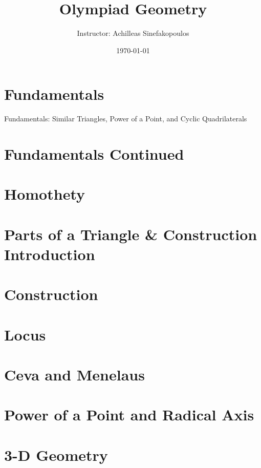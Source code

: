 \documentclass[11pt, twoside]{scrbook}
\begin{document}
\title{Olympiad Geometry}


\author{Instructor: Achilleas Sinefakopoulos}
\date{\today}

\maketitle

\setcounter{secnumdepth}{3}
\setcounter{tocdepth}{3}

\tableofcontents

\chapter{Fundamentals}
Fundamentals: Similar Triangles, Power of a Point, and Cyclic Quadrilaterals	


\chapter{Fundamentals Continued}


\chapter{Homothety}


\chapter{Parts of a Triangle \& Construction Introduction}
\chapter{Construction}
\chapter{Locus}
\chapter{Ceva and Menelaus	}
\chapter{Power of a Point and Radical Axis}
\chapter{3-D Geometry}
\end{document}
